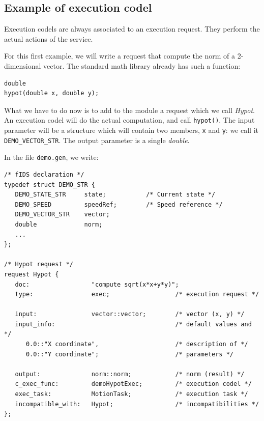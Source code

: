 \subsection{Example of execution codel}

Execution  codels are always associated  to   an execution request.  They
perform the actual actions of the service.

For this first example, we will write a request  that compute the norm of
a 2-dimensional vector. The standard math library already has such a
function:

\begin{center}\begin{cartouche}\small\begin{verbatim}
double
hypot(double x, double y);
\end{verbatim}\end{cartouche}\end{center}

What we have to do now  is to add  to the module  a request which we call
{\em Hypot}. An execution codel will do  the actual computation, and call
{\tt hypot()}. The input parameter will be a structure which will contain
two members, {\tt x} and {\tt y}: we call it {\tt DEMO\_VECTOR\_STR}. The
output parameter is a single {\em double}.

In the file {\tt demo.gen}, we write:

\begin{center}\begin{cartouche}\small\begin{verbatim}
/* fIDS declaration */
typedef struct DEMO_STR {
   DEMO_STATE_STR     state;           /* Current state */
   DEMO_SPEED         speedRef;        /* Speed reference */
   DEMO_VECTOR_STR    vector;
   double             norm;
   ...
};

/* Hypot request */
request Hypot {
   doc:                 "compute sqrt(x*x+y*y)";
   type:                exec;                  /* execution request */

   input:               vector::vector;        /* vector (x, y) */
   input_info:                                 /* default values and */
      0.0::"X coordinate",                     /* description of */
      0.0::"Y coordinate";                     /* parameters */
   
   output:              norm::norm;            /* norm (result) */
   c_exec_func:         demoHypotExec;         /* execution codel */
   exec_task:           MotionTask;            /* execution task */
   incompatible_with:   Hypot;                 /* incompatibilities */
};
\end{verbatim}\end{cartouche}\end{center}

